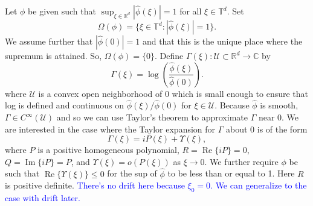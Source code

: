 \documentclass[11pt]{article}
\renewcommand\Re{\operatorname{Re}}%
\renewcommand\Im{\operatorname{Im}}
\newcommand\R{\mathbb{R}}
\newcommand{\lp}{\left(}
\newcommand{\rp}{\right)}
\newcommand{\f}[2]{\frac{#1}{#2}}
\begin{document}









Let $\phi$ be given such that $\sup_{\xi\in \mathbb{R}^d}|\hat{\phi}(\xi)| = 1$ for all $\xi \in\mathbb{T}^d$. Set 
\begin{equation*}
    \Omega(\phi) = \{ \xi \in \mathbb{T}^d : |\hat{\phi}(\xi)| = 1 \}.
\end{equation*}
We assume further that $|\hat{\phi}(0)| = 1$ and that this is the unique place where the supremum is attained. So, $\Omega(\phi) = \{ 0\}$. Define $\Gamma(\xi): \mathcal{U} \subset \R^d \to \mathbb{C}$ by 
\begin{equation*}
    \Gamma(\xi) = \log \lp \f{\hat{\phi}(\xi)}{\hat{\phi}(0)} \rp. 
\end{equation*}
where $\mathcal{U}$ is a convex open neighborhood of $0$ which is small enough to ensure that log is defined and continuous on $\hat{\phi}(\xi)/\hat{\phi}(0)$ for $\xi \in \mathcal{U}$. Because $\hat{\phi}$ is smooth, $\Gamma \in C^\infty(\mathcal{U})$ and so we can use Taylor's theorem to approximate $\Gamma$ near 0. We are interested in the case where the Taylor expansion for $\Gamma$ about 0 is of the form
\begin{equation*}
    \Gamma(\xi) = iP(\xi) + \Upsilon(\xi),
\end{equation*}
where $P$ is a positive homogeneous polynomial, $R = \Re\{ iP \} =  0$, $Q = \Im \{iP\} = P$, and $\Upsilon(\xi) = o(P(\xi))$ as $\xi \to 0$. We further require $\phi$ be such that $\Re \{\Upsilon(\xi)\}\leq 0 $ for the sup of $\hat{\phi}$ to be less than or equal to 1. Here $R$ is positive definite. \textcolor{blue}{There's no drift here because $\xi_0 = 0$. We can generalize to the case with drift later.}
\end{document}
